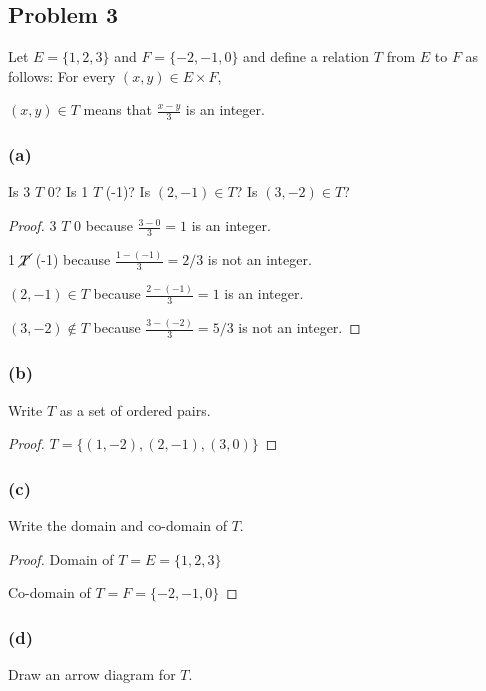 \documentclass[14pt]{extarticle}
\newcommand{\dps}{\displaystyle}
\begin{document}
\subsection{Problem 3}
Let $E = \{1, 2, 3\}$ and $F = \{-2, -1, 0\}$ and define a relation $T$ from
$E$ to $F$ as follows: For every $(x, y) \in E \times F$,

\begin{center}
$(x, y) \in T$ means that $\dps\frac{x-y}{3}$ is an integer.
\end{center}

\subsubsection{(a)}
Is 3 $T$ 0? Is 1 $T$ (-1)? Is $(2, -1) \in T$? Is $(3, -2) \in T$?

\begin{proof}
3 $T$ 0 because $\dps\frac{3-0}{3} = 1$ is an integer.

1 $\cancel{T}$ (-1) because $\dps\frac{1-(-1)}{3} = 2/3$ is not an integer.

$(2, -1) \in T$ because $\dps\frac{2-(-1)}{3} = 1$ is an integer.

$(3, -2) \notin T$ because $\dps\frac{3-(-2)}{3} = 5/3$ is not an integer.
\end{proof}

\subsubsection{(b)}
Write $T$ as a set of ordered pairs.

\begin{proof}
$T = \{(1, -2), (2, -1), (3, 0)\}$
\end{proof}

\subsubsection{(c)}
Write the domain and co-domain of $T$.

\begin{proof}
Domain of $T = E = \{1, 2, 3\}$

Co-domain of $T = F = \{-2, -1, 0\}$
\end{proof}

\subsubsection{(d)}
Draw an arrow diagram for $T$.
\end{document}
